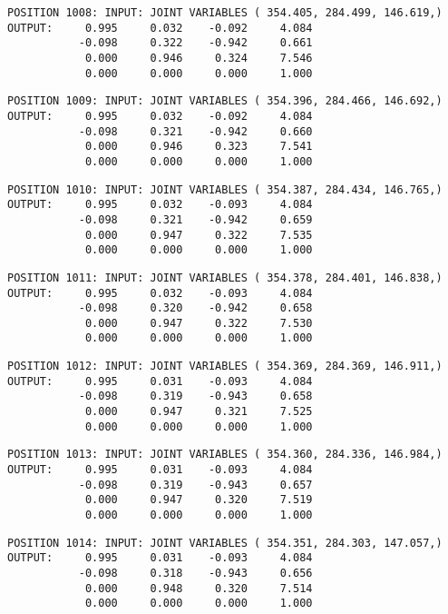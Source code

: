 \begin{verbatim}
POSITION 1008: INPUT: JOINT VARIABLES ( 354.405, 284.499, 146.619,)
OUTPUT:     0.995     0.032    -0.092     4.084
           -0.098     0.322    -0.942     0.661
            0.000     0.946     0.324     7.546
            0.000     0.000     0.000     1.000
\end{verbatim} \pagebreak[1]\begin{verbatim}
POSITION 1009: INPUT: JOINT VARIABLES ( 354.396, 284.466, 146.692,)
OUTPUT:     0.995     0.032    -0.092     4.084
           -0.098     0.321    -0.942     0.660
            0.000     0.946     0.323     7.541
            0.000     0.000     0.000     1.000
\end{verbatim} \pagebreak[1]\begin{verbatim}
POSITION 1010: INPUT: JOINT VARIABLES ( 354.387, 284.434, 146.765,)
OUTPUT:     0.995     0.032    -0.093     4.084
           -0.098     0.321    -0.942     0.659
            0.000     0.947     0.322     7.535
            0.000     0.000     0.000     1.000
\end{verbatim} \pagebreak[1]\begin{verbatim}
POSITION 1011: INPUT: JOINT VARIABLES ( 354.378, 284.401, 146.838,)
OUTPUT:     0.995     0.032    -0.093     4.084
           -0.098     0.320    -0.942     0.658
            0.000     0.947     0.322     7.530
            0.000     0.000     0.000     1.000
\end{verbatim} \pagebreak[1]\begin{verbatim}
POSITION 1012: INPUT: JOINT VARIABLES ( 354.369, 284.369, 146.911,)
OUTPUT:     0.995     0.031    -0.093     4.084
           -0.098     0.319    -0.943     0.658
            0.000     0.947     0.321     7.525
            0.000     0.000     0.000     1.000
\end{verbatim} \pagebreak[1]\begin{verbatim}
POSITION 1013: INPUT: JOINT VARIABLES ( 354.360, 284.336, 146.984,)
OUTPUT:     0.995     0.031    -0.093     4.084
           -0.098     0.319    -0.943     0.657
            0.000     0.947     0.320     7.519
            0.000     0.000     0.000     1.000
\end{verbatim} \pagebreak[1]\begin{verbatim}
POSITION 1014: INPUT: JOINT VARIABLES ( 354.351, 284.303, 147.057,)
OUTPUT:     0.995     0.031    -0.093     4.084
           -0.098     0.318    -0.943     0.656
            0.000     0.948     0.320     7.514
            0.000     0.000     0.000     1.000
\end{verbatim} \pagebreak[1]\begin{verbatim}

\end{verbatim}
